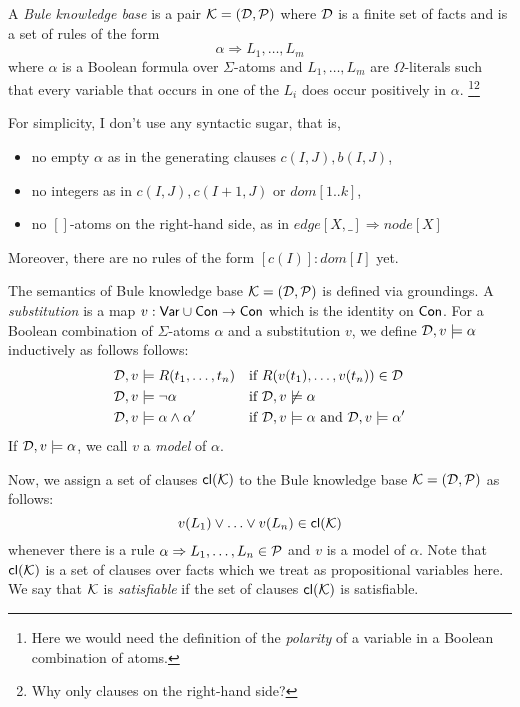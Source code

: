 \documentclass{new_tlp}
\begin{document}
A \emph{Bule knowledge base} is a pair $\mathcal{K}=(\mathcal{D},\mathcal{P})$ where $\mathcal{D}$ is a finite set of facts and \Pmc is a set of rules of the form 
%
\[\alpha \Rightarrow L_1,\ldots,L_m\]
%
where $\alpha$ is a Boolean formula over $\Sigma$-atoms and $L_1,\ldots,L_m$ are $\Omega$-literals such that every variable that occurs in one of the $L_i$ does occur positively in $\alpha$.
\footnote{Here we would need the definition of the
  \emph{polarity} of a variable in a Boolean combination of
atoms.}\footnote{Why only clauses on the right-hand side?}
{\color{red}For simplicity, I don't use any syntactic sugar, that is,
%
\begin{itemize}

  \item no empty $\alpha$ as in the generating clauses $c(I,J),b(I,J)$,

  \item no integers as in $c(I,J),c(I+1,J)$ or $dom[1..k]$,

  \item no $[]$-atoms on the right-hand side, as in $edge[X,\_ ] \Rightarrow node[X]$

\end{itemize}
Moreover, there are no rules of the form $[c(I)]:dom[I]$ yet. 
}

The semantics of Bule knowledge base $\mathcal{K}=(\mathcal{D},\mathcal{P})$ is defined via groundings. 
A \emph{substitution} is a map $v:\mathsf{Var}\cup\mathsf{Con}\to\mathsf{Con}$ which is the identity on $\mathsf{Con}$. 
For a Boolean combination of $\Sigma$-atoms $\alpha$ and a substitution $v$, we define $\mathcal{D},v\models \alpha$ inductively as follows follows: 
%
\begin{align*}
  \mathcal{D},v & \models R(t_1,\ldots,t_n) && \text{if
  $R(v(t_1),\ldots,v(t_n))\in \mathcal{D}$} \\
  \mathcal{D}, v& \models \neg \alpha && \text{if $\mathcal{D},v\not\models \alpha$}
  \\
  \mathcal{D}, v& \models \alpha \wedge \alpha' && \text{if $\mathcal{D},v\models
  \alpha$ and $\mathcal{D},v\models\alpha'$}
\end{align*}
%
If $\mathcal{D},v\models\alpha$, we call $v$ a \emph{model} of $\alpha$.

Now, we assign a set of clauses $\mathsf{cl}(\mathcal{K})$ to the Bule knowledge
base $\mathcal{K}=(\mathcal{D},\mathcal{P})$ as follows:
%
\[v(L_1)\vee\ldots\vee v(L_n)\in \mathsf{cl}(\mathcal{K})\]
%
whenever there is a rule $\alpha \Rightarrow L_1,\ldots,L_n\in\mathcal{P}$ and $v$ is a model of $\alpha$. 
Note that $\mathsf{cl}(\mathcal{K})$ is a set of clauses over facts which we treat as propositional variables here.  
We say that $\mathcal{K}$ is \emph{satisfiable} if the set of clauses $\mathsf{cl}(\mathcal{K})$ is satisfiable. 
\end{document}
